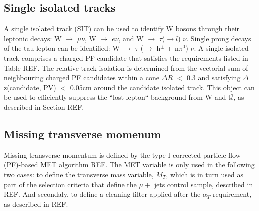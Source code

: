 \subsection{Single isolated tracks}
A single isolated track (SIT) can be used to identify W bosons through their leptonic decays: W $\rightarrow$ $\mu \nu$, W $\rightarrow$ $e\nu$, and W $\rightarrow$ $\tau$($\rightarrow l$) $\nu$. Single prong decays of the tau lepton can be identified: W $\rightarrow$ $\tau$ ($\rightarrow$ h$^{\pm}$ + n$\pi^{0}$) $\nu$. A single isolated track comprises a charged PF candidate that satisfies the requirements listed in Table REF. The relative track isolation is determined from the vectorial sum of neighbouring charged PF candidates within a cone $\Delta R$ $<$ 0.3 and satisfying $\Delta$z(candidate, PV) $<$ 0.05cm around the candidate isolated track.
This object can be used to efficiently suppress the ``lost lepton`` background from W and t$\bar{t}$, as described in Section REF. 

\subsection{Missing transverse momenum}
Missing transverse momentum is defined by the type-I corrected particle-flow (PF)-based MET algorithm REF. The MET variable is only used in the following two cases: to define the transverse mass variable, $M_{T}$, which is in turn used as part of the selection criteria that define the $\mu +$ jets control sample, described in REF. And secondaly, to define a cleaning filter applied after the $\alpha_{T}$ requirement, as described in REF.


